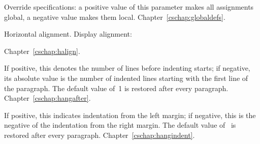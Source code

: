 \begin{glossinventory}
\item [\cs{globaldefs}]
      Override  specifications: a positive value of this
      parameter makes all assignments global, a negative value
      makes them local.
Chapter~\ref{cschap:globaldefs}.

\item [\cs{halign\gr{box specification}\lb\gr{alignment material}\rb{}}]
      Horizontal alignment.
      Display alignment:
      \begin{disp}\n{\$\$}\lb{}\rb
      \n{\$\$}\end{disp}
Chapter~\ref{cschap:halign}.

\item [\cs{hangafter}]
      If positive, this denotes the number of lines 
      before indenting starts; 
      if negative, its absolute value is the number 
      of indented lines starting with the first line of the paragraph. 
      The default value of~1 is restored after every paragraph.
Chapter~\ref{cschap:hangafter}.

\item [\cs{hangindent}]
      If positive, this indicates indentation from the left margin; 
      if negative, this is the negative of the indentation 
      from the right margin. 
      The default value of~\n{0pt} is restored after every paragraph.
Chapter~\ref{cschap:hangindent}.


\end{glossinventory}
